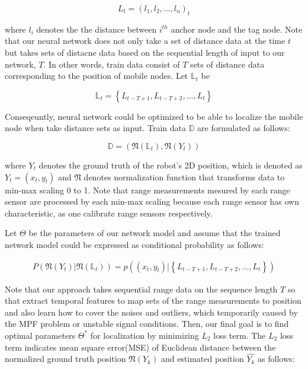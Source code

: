 \documentclass[letterpaper, 10 pt, conference]{ieeeconf}  %
\begin{document}
\begin{equation}
L_{t} = (l_{1}, l_{2}, ..., l_{n})_{t}
\end{equation}

where $l_{i}$ denotes the the distance between $i^{th}$ anchor node and the tag node. Note that our neural network does not only take a set of distance data at the time $t$ but takes sets of distacne data based on the sequential length of input to our network, $T$. In other words, train data consist of $T$ sets of distance data  corresponding to the position of mobile nodes. Let $\mathbb{L}_t$ be 

\begin{equation}
\mathbb{L}_t = \left\{L_{t-T+1}, L_{t-T+2}, ..., L_t\right\} 
\end{equation}

Conseqeuntly, neural network  could be optimized to be able to localize the mobile node when take distance sets as input. Train data $\mathbb{D}$ are formulated as follows:

\begin{equation}
\mathbb{D} = {(\mathfrak{N}(\mathbb{L}_t), \mathfrak{N}(Y_t))} 
\end{equation}

where $Y_t$ denotes the ground truth of the robot's 2D position, which is denoted as $Y_t = (x_t, y_t)$ and $\mathfrak{N}$ denotes normalization function that transforms data to min-max scaling 0 to 1. Note that range measurements mesured by each range sensor are processed by each min-max scaling because each range sensor has own characteristic, as one calibrate range sensors respectively.  

Let $\Theta$ be the parameters of our network model and assume that the trained network model could be expressed as conditional probability as follows:

\begin{multline}
P(\mathfrak{N}(Y_t)|\mathfrak{N}(\mathbb{L}_t)) = p((x_t, y_t)|\left\{L_{t-T+1}, L_{t-T+2}, ..., L_t\right\})
\end{multline}  

Note that our approach takes sequential range data on the sequence length $T$ so that extract temporal features to map sets of the range measurements to position and also learn how to cover the noises and outliers, which temporarily caused by the MPF problem or unstable signal conditions. Then, our final goal is to find optimal parameters $\Theta^{*}$ for localization by minimizing $L_2$ loss term. The $L_2$ loss term indicates mean square error(MSE) of Euclidean distance between the normalized ground truth position $\mathfrak{N}(Y_k)$ and estimated position $\hat{Y_k}$ as follows:
\end{document}
